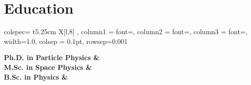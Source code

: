 
\begin{minipage}[t]{0.62\textwidth}  %
    \section{Education}

	\begin{tblr}{%
		colspec={ t{5.25cm} X[l,8] },  %
		column{1} = {font=\fontsize{11}{12}\selectfont}, %
		column{2} = {font=\fontsize{11}{12}\selectfont},           %
		column{3} = {font=\fontsize{11}{12}\selectfont},           %
		width=1.0\textwidth,
		colsep = 0.1pt,  %
		rowsep=0.001\baselineskip} %
	
	\bfseries Ph.D. in Particle Physics &  \\
	\bfseries M.Sc. in Space Physics &  \\
	\bfseries B.Sc. in Physics &  \\
	\end{tblr}

\end{minipage}
\hspace{0.03\textwidth} 
